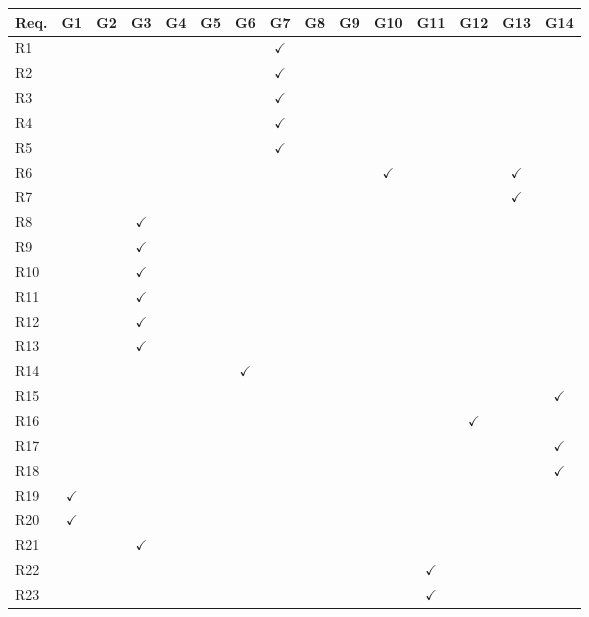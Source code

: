 \begin{longtable}{|l|c|c|c|c|c|c|c|c|c|c|c|c|c|c|}
\hline
\textbf{Req.} & \textbf{G1} & \textbf{G2} & \textbf{G3} & \textbf{G4} & \textbf{G5} & \textbf{G6} & \textbf{G7} & \textbf{G8} & \textbf{G9} & \textbf{G10} & \textbf{G11} & \textbf{G12} & \textbf{G13} & \textbf{G14} \\ \hline
\endhead

R1 & & & & & & & $\checkmark$ & & & & & & & \\ \hline
R2 & & & & & & & $\checkmark$ & & & & & & & \\ \hline
R3 & & & & & & & $\checkmark$ & & & & & & & \\ \hline
R4 & & & & & & & $\checkmark$ & & & & & & & \\ \hline
R5 & & & & & & & $\checkmark$ & & & & & & & \\ \hline
R6 & & & & & & & & & & $\checkmark$ & & & $\checkmark$ & \\ \hline
R7 & & & & & & & & & & & & & $\checkmark$ & \\ \hline
R8 & & & $\checkmark$ & & & & & & & & & & & \\ \hline
R9 & & & $\checkmark$ & & & & & & & & & & & \\ \hline
R10 & & & $\checkmark$ & & & & & & & & & & & \\ \hline
R11 & & & $\checkmark$ & & & & & & & & & & & \\ \hline
R12 & & & $\checkmark$ & & & & & & & & & & & \\ \hline
R13 & & & $\checkmark$ & & & & & & & & & & & \\ \hline
R14 & & & & & & $\checkmark$ & & & & & & & & \\ \hline
R15 & & & & & & & & & & & & & & $\checkmark$ \\ \hline
R16 & & & & & & & & & & & & $\checkmark$ & & \\ \hline
R17 & & & & & & & & & & & & & & $\checkmark$ \\ \hline
R18 & & & & & & & & & & & & & & $\checkmark$ \\ \hline
R19 & $\checkmark$ & & & & & & & & & & & & & \\ \hline
R20 & $\checkmark$ & & & & & & & & & & & & & \\ \hline
R21 & & & $\checkmark$ & & & & & & & & & & & \\ \hline
R22 & & & & & & & & & & & $\checkmark$ & & & \\ \hline
R23 & & & & & & & & & & & $\checkmark$ & & & \\ \hline

\end{longtable}
